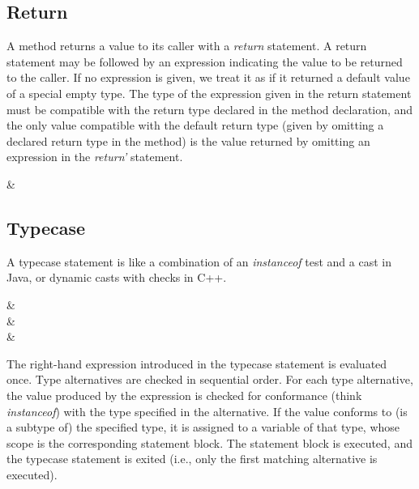 \documentclass[11pt]{article}
\begin{document}
\subsection{Return}

A method returns a value to its caller with a \emph{return} statement.
A return statement may be followed by an expression indicating the
value to be returned to the caller.  If no expression is given, we treat
it as if it returned a default value of a special empty type.  The
type of the expression given in the return statement must be
compatible with the return type declared in the method declaration,
and the only value compatible with the default return type (given by
omitting a declared return type in the method) is the value returned
by omitting an expression in the \emph{return'} statement. 

\begin{grammar}
 & 
    \literal{;}
\end{grammar}



\subsection{Typecase}

A typecase statement is like a combination of an \emph{instanceof}
test and a cast in Java, or dynamic casts with checks in C++.  

\begin{grammar}
 &  \\
 & 
     \literal{\{}
     \literal{\}}\\
 &
     \literal{:} 
    \\
\end{grammar}

The right-hand expression introduced in the typecase statement is
evaluated once.  Type alternatives are checked in sequential order. 
For each type alternative, the value produced by the
expression is checked for conformance (think \emph{instanceof}) with
the type specified in the alternative.   If the value conforms to (is
a subtype of) the specified type, it is assigned to a variable of that
type, whose scope is the corresponding statement block.  The statement
block is executed, and the typecase statement is exited (i.e., only
the first matching alternative is executed).   
\end{document}
